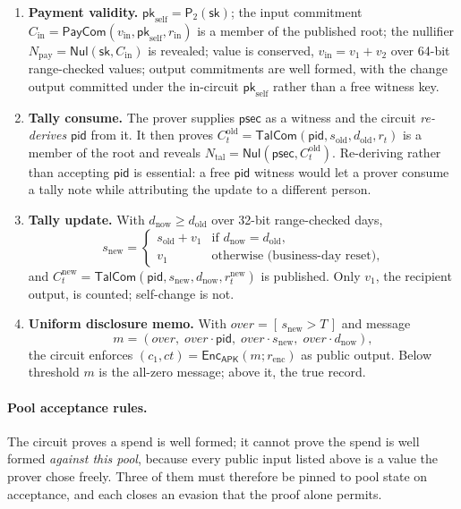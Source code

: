 \documentclass[11pt,a4paper]{article}
\theoremstyle{definition}
\theoremstyle{plain}
\theoremstyle{remark}
\newcommand{\pid}{\ensuremath{\mathsf{pid}}}
\newcommand{\psec}{\ensuremath{\mathsf{psec}}}
\newcommand{\Pcom}{\ensuremath{\mathsf{PayCom}}}
\newcommand{\Tcom}{\ensuremath{\mathsf{TalCom}}}
\newcommand{\Nul}{\ensuremath{\mathsf{Nul}}}
\newcommand{\Enc}{\ensuremath{\mathsf{Enc}}}
\newcommand{\PT}{\ensuremath{\mathsf{P}_2}}
\begin{document}
\begin{enumerate}
\item \textbf{Payment validity.} $\mathsf{pk}_{\mathrm{self}} = \PT(\mathsf{sk})$; the input commitment $C_{\mathrm{in}} = \Pcom(v_{\mathrm{in}}, \mathsf{pk}_{\mathrm{self}}, r_{\mathrm{in}})$ is a member of the published root; the nullifier $N_{\mathrm{pay}} = \Nul(\mathsf{sk}, C_{\mathrm{in}})$ is revealed; value is conserved, $v_{\mathrm{in}} = v_1 + v_2$ over 64-bit range-checked values; output commitments are well formed, with the change output committed under the in-circuit $\mathsf{pk}_{\mathrm{self}}$ rather than a free witness key.

\item \textbf{Tally consume.} The prover supplies $\psec$ as a witness and the circuit \emph{re-derives} $\pid$ from it. It then proves $C_t^{\mathrm{old}} = \Tcom(\pid, s_{\mathrm{old}}, d_{\mathrm{old}}, r_t)$ is a member of the root and reveals $N_{\mathrm{tal}} = \Nul(\psec, C_t^{\mathrm{old}})$. Re-deriving rather than accepting $\pid$ is essential: a free $\pid$ witness would let a prover consume a tally note while attributing the update to a different person.

\item \textbf{Tally update.} With $d_{\mathrm{now}} \geq d_{\mathrm{old}}$ over 32-bit range-checked days,
\[
s_{\mathrm{new}} = \begin{cases} s_{\mathrm{old}} + v_1 & \text{if } d_{\mathrm{now}} = d_{\mathrm{old}},\\ v_1 & \text{otherwise (business-day reset),}\end{cases}
\]
and $C_t^{\mathrm{new}} = \Tcom(\pid, s_{\mathrm{new}}, d_{\mathrm{now}}, r_t^{\mathrm{new}})$ is published. Only $v_1$, the recipient output, is counted; self-change is not.

\item \textbf{Uniform disclosure memo.} With $\mathit{over} = [\,s_{\mathrm{new}} > T\,]$ and message
\[
m = (\mathit{over},\; \mathit{over}\cdot\pid,\; \mathit{over}\cdot s_{\mathrm{new}},\; \mathit{over}\cdot d_{\mathrm{now}}),
\]
the circuit enforces $(c_1, \mathit{ct}) = \Enc_{\mathsf{APK}}(m; r_{\mathrm{enc}})$ as public output. Below threshold $m$ is the all-zero message; above it, the true record.
\end{enumerate}

\paragraph{Pool acceptance rules.} The circuit proves a spend is well formed; it cannot prove the spend is well formed \emph{against this pool}, because every public input listed above is a value the prover chose freely. Three of them must therefore be pinned to pool state on acceptance, and each closes an evasion that the proof alone permits.
\end{document}
